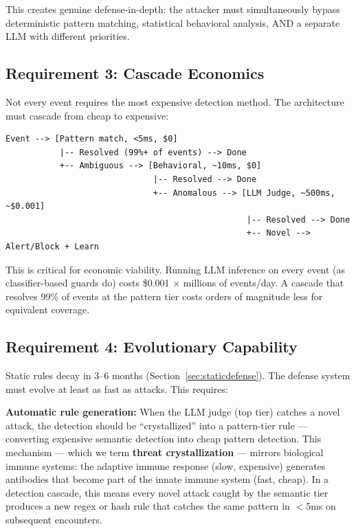 \documentclass[11pt,letterpaper]{article}
\begin{document}
This creates genuine defense-in-depth: the attacker must simultaneously bypass deterministic pattern matching, statistical behavioral analysis, AND a separate LLM with different priorities.

\subsection{Requirement 3: Cascade Economics}

Not every event requires the most expensive detection method. The architecture must cascade from cheap to expensive:

\begin{lstlisting}
Event --> [Pattern match, <5ms, $0]
           |-- Resolved (99%+ of events) --> Done
           +-- Ambiguous --> [Behavioral, ~10ms, $0]
                              |-- Resolved --> Done
                              +-- Anomalous --> [LLM Judge, ~500ms, ~$0.001]
                                                 |-- Resolved --> Done
                                                 +-- Novel --> Alert/Block + Learn
\end{lstlisting}

This is critical for economic viability. Running LLM inference on every event (as classifier-based guards do) costs \$0.001 $\times$ millions of events/day. A cascade that resolves 99\% of events at the pattern tier costs orders of magnitude less for equivalent coverage.

\subsection{Requirement 4: Evolutionary Capability}

Static rules decay in 3--6 months (Section~\ref{sec:staticdefense}). The defense system must evolve at least as fast as attacks. This requires:

\textbf{Automatic rule generation:} When the LLM judge (top tier) catches a novel attack, the detection should be ``crystallized'' into a pattern-tier rule --- converting expensive semantic detection into cheap pattern detection. This mechanism --- which we term \textbf{threat crystallization} --- mirrors biological immune systems: the adaptive immune response (slow, expensive) generates antibodies that become part of the innate immune system (fast, cheap). In a detection cascade, this means every novel attack caught by the semantic tier produces a new regex or hash rule that catches the same pattern in $<$5ms on subsequent encounters.
\end{document}
